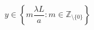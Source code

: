 \documentclass[../main.tex]{subfiles}
\begin{document}
\begin{equation} \label{eq:y=0 values}
    y \in \left\{m\frac{\lambda L}{a}: m \in \mathbb{Z}_{\setminus \{0\}} \right\}
\end{equation}



\end{document}
